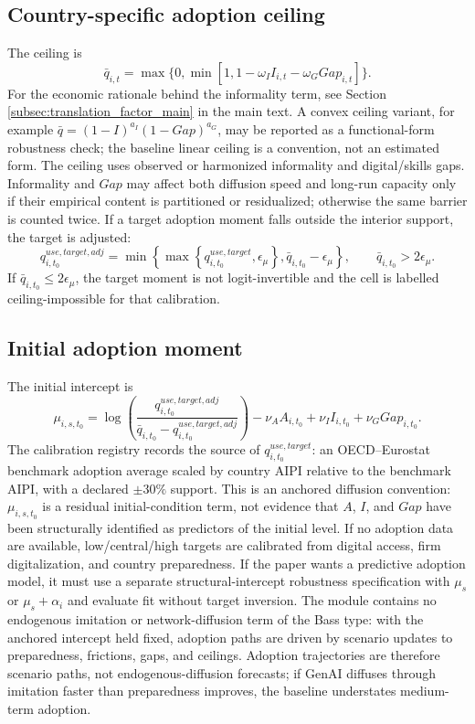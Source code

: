 \documentclass[11pt,a4paper]{article}
\begin{document}
\subsection{Country-specific adoption ceiling}

The ceiling is
\begin{equation}
    \bar q_{i,t}=\max\{0,\min[1,1-\omega_I I_{i,t}-\omega_G Gap_{i,t}]\}.
\end{equation}
For the economic rationale behind the informality term, see Section \ref{subsec:translation_factor_main} in the main text. A convex ceiling variant, for example $\bar q=(1-I)^{a_I}(1-Gap)^{a_G}$, may be reported as a functional-form robustness check; the baseline linear ceiling is a convention, not an estimated form.
The ceiling uses observed or harmonized informality and digital/skills gaps. Informality and $Gap$ may affect both diffusion speed and long-run capacity only if their empirical content is partitioned or residualized; otherwise the same barrier is counted twice. If a target adoption moment falls outside the interior support, the target is adjusted:
\begin{equation}
    q^{use,target,adj}_{i,t_0}
    =\min\left\{\max\left\{q^{use,target}_{i,t_0},\epsilon_\mu\right\},\bar q_{i,t_0}-\epsilon_\mu\right\},
    \qquad \bar q_{i,t_0}>2\epsilon_\mu.
\end{equation}
If $\bar q_{i,t_0}\leq2\epsilon_\mu$, the target moment is not logit-invertible and the cell is labelled ceiling-impossible for that calibration.

\subsection{Initial adoption moment}

The initial intercept is
\begin{equation}
    \mu_{i,s,t_0}=\log\left(\frac{q^{use,target,adj}_{i,t_0}}{\bar q_{i,t_0}-q^{use,target,adj}_{i,t_0}}\right)
    -\nu_A A_{i,t_0}+\nu_I I_{i,t_0}+\nu_G Gap_{i,t_0}.
\end{equation}
The calibration registry records the source of $q^{use,target}_{i,t_0}$: an OECD--Eurostat benchmark adoption average scaled by country AIPI relative to the benchmark AIPI, with a declared $\pm30\%$ support. This is an anchored diffusion convention: $\mu_{i,s,t_0}$ is a residual initial-condition term, not evidence that $A$, $I$, and $Gap$ have been structurally identified as predictors of the initial level. If no adoption data are available, low/central/high targets are calibrated from digital access, firm digitalization, and country preparedness. If the paper wants a predictive adoption model, it must use a separate structural-intercept robustness specification with $\mu_s$ or $\mu_s+\alpha_i$ and evaluate fit without target inversion. The module contains no endogenous imitation or network-diffusion term of the Bass type: with the anchored intercept held fixed, adoption paths are driven by scenario updates to preparedness, frictions, gaps, and ceilings. Adoption trajectories are therefore scenario paths, not endogenous-diffusion forecasts; if GenAI diffuses through imitation faster than preparedness improves, the baseline understates medium-term adoption.
\end{document}
